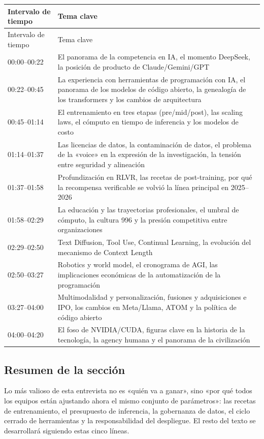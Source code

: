 \begin{longtable}{p{}p{}}
\toprule
Intervalo de tiempo & Tema clave \\
\midrule
\endfirsthead
\toprule
Intervalo de tiempo & Tema clave \\
\midrule
\endhead
00:00--00:22 & El panorama de la competencia en IA, el momento DeepSeek, la posición de producto de Claude/Gemini/GPT \\
00:22--00:45 & La experiencia con herramientas de programación con IA, el panorama de los modelos de código abierto, la genealogía de los transformers y los cambios de arquitectura \\
00:45--01:14 & El entrenamiento en tres etapas (pre/mid/post), las scaling laws, el cómputo en tiempo de inferencia y los modelos de costo \\
01:14--01:37 & Las licencias de datos, la contaminación de datos, el problema de la «voice» en la expresión de la investigación, la tensión entre seguridad y alineación \\
01:37--01:58 & Profundización en RLVR, las recetas de post-training, por qué la recompensa verificable se volvió la línea principal en 2025--2026 \\
01:58--02:29 & La educación y las trayectorias profesionales, el umbral de cómputo, la cultura 996 y la presión competitiva entre organizaciones \\
02:29--02:50 & Text Diffusion, Tool Use, Continual Learning, la evolución del mecanismo de Context Length \\
02:50--03:27 & Robotics y world model, el cronograma de AGI, las implicaciones económicas de la automatización de la programación \\
03:27--04:00 & Multimodalidad y personalización, fusiones y adquisiciones e IPO, los cambios en Meta/Llama, ATOM y la política de código abierto \\
04:00--04:20 & El foso de NVIDIA/CUDA, figuras clave en la historia de la tecnología, la agency humana y el panorama de la civilización \\
\bottomrule
\end{longtable}

\subsection{Resumen de la sección}

Lo más valioso de esta entrevista no es «quién va a ganar», sino «por qué todos los equipos están ajustando ahora el mismo conjunto de parámetros»: las recetas de entrenamiento, el presupuesto de inferencia, la gobernanza de datos, el ciclo cerrado de herramientas y la responsabilidad del despliegue. El resto del texto se desarrollará siguiendo estas cinco líneas.
